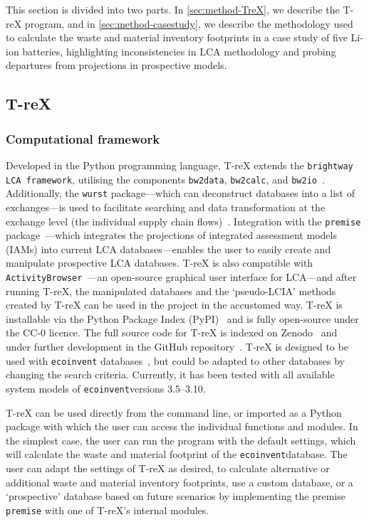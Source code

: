 This section is divided into two parts. In \autoref{sec:method-TreX}, we describe the T-reX program, and in \autoref{sec:method-casestudy}, we describe the methodology used to calculate the waste and material inventory footprints in a case study of five Li-ion batteries, highlighting inconsistencies in LCA methodology and probing departures from projections in prospective models.

\subsection{T-reX}\label{sec:method-TreX}

\subsubsection{Computational framework}

Developed in the Python programming language, T-reX extends the \texttt{brightway LCA framework}, utilising the components \texttt{bw2data}, \texttt{bw2calc}, and \texttt{bw2io}~\citep{mutel2017brightway}. Additionally, the \texttt{wurst} package---which can deconstruct databases into a list of exchanges---is used to facilitate searching and data transformation at the exchange level (the individual supply chain flows)~\citep{mutel2017wurst}. Integration with the \texttt{premise} package~\citep{sacchi2022premise}---which integrates the projections of integrated assessment models (IAMs) into current LCA databases---enables the user to easily create and manipulate prospective LCA databases. T-reX is also compatible with \texttt{ActivityBrowser}~\citep{steubing2020activitybrowser}---an open-source graphical user interface for LCA---and after running T-reX, the manipulated databases and the `pseudo-LCIA' methods created by T-reX can be used in the project in the accustomed way. T-reX is installable via the Python Package Index (PyPI)~\citep{mcdowall2023T-reXpipy} and is fully open-source under the CC-0 licence. The full source code for T-reX is indexed on Zenodo~\citep{mcdowall2023T-reXzenodo} and under further development in the GitHub repository~\citep{mcdowall2024T-reXgithub}. T-reX is designed to be used with \texttt{ecoinvent} databases~\citep{ecoinvent2016version3}, but could be adapted to other databases by changing the search criteria. Currently, it has been tested with all available system models of \texttt{ecoinvent}versions 3.5--3.10.

T-reX can be used directly from the command line, or imported as a Python package with which the user can access the individual functions and modules. In the simplest case, the user can run the program with the default settings, which will calculate the waste and material footprint of the \texttt{ecoinvent}database. The user can adapt the settings of T-reX as desired, to calculate alternative or additional waste and material inventory footprints, use a custom database, or a `prospective' database based on future scenarios by implementing the premise \texttt{premise} with one of T-reX's internal modules.

